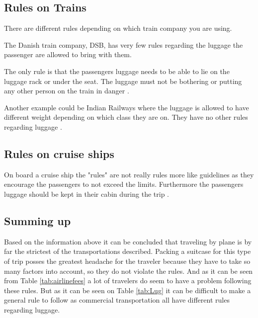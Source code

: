 \subsection{Rules on Trains}

There are different rules depending on which train company you are using. 

The Danish train company, DSB, has very few rules regarding the luggage the passenger are allowed to bring with them. 


The only rule is that the passengers luggage needs to be able to lie on the luggage rack or under the seat. The luggage must not be bothering or putting any other person on the train in danger \citep{rulestrain}.


Another example could be Indian Railways where the luggage is allowed to have different weight depending on which class they are on. They have no other rules regarding luggage \citep{idianrules}.

\subsection{Rules on cruise ships}
On board a cruise ship the "rules" are not really rules more like guidelines as they encourage the passengers to not exceed the limits. Furthermore the passengers luggage should be kept in their cabin during the trip \citep{Cruise}.

\subsection{Summing up}
Based on the information above it can be concluded that traveling by plane is by far the strictest of the transportations described. Packing a suitcase for this type of trip posses the greatest headache for the traveler because they have to take so many factors into account, so they do not violate the rules. And as it can be seen from Table \ref{tab:airlinefees} a lot of travelers do seem to have a problem following these rules. But as it can be seen on Table \ref{tab:Lug} it can be difficult to make a general rule to follow as commercial transportation all have different rules regarding luggage.